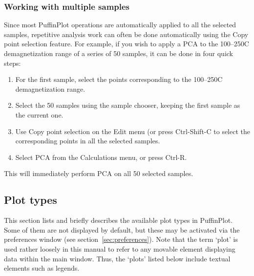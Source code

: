 \documentclass[a4paper,british]{article}
\newcommand{\ppcmd}[1]{\textsf{#1}} %
\newcommand{\caps}[1]{\MakeTextUppercase{#1}} %
\begin{document}
\subsubsection{Working with multiple samples}

Since most PuffinPlot operations are automatically applied to all the
selected samples, repetitive analysis work can often be done automatically
using the \ppcmd{Copy point selection} feature. For example, if you wish to
apply a \caps{pca} to the 100--250\textdegree{}C demagnetization range of a
series of 50 samples, it can be done in four quick steps:

\begin{enumerate}

\item For the first sample, select the points corresponding to the
  100--250\textdegree{}C demagnetization range.

\item Select the 50 samples using the sample chooser, keeping the
  first sample as the current one.

\item Use \ppcmd{Copy point selection} on the \ppcmd{Edit} menu
  (or press \ppcmd{Ctrl-Shift-C} to select the corresponding points
  in all the selected samples.

\item Select \ppcmd{\caps{pca}} from the \ppcmd{Calculations} menu,
  or press \ppcmd{Ctrl-R}.

\end{enumerate}

This will immediately perform \caps{pca} on all 50 selected samples.

\subsection{\label{sec:plot-types}Plot types}

This section lists and briefly describes the available plot types in
PuffinPlot. Some of them are not displayed by default, but these may be
activated via the preferences window (see
section~\ref{sec:preferences}). Note that the term `plot' is used
rather loosely in this manual to refer to any movable element displaying data
within the main window. Thus, the `plots' listed below include textual
elements such as legends.
\end{document}
